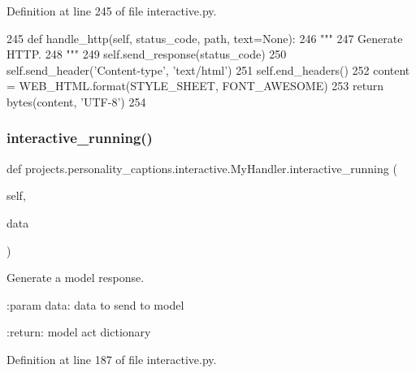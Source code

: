 Definition at line 245 of file interactive.\+py.


\begin{DoxyCode}
245     \textcolor{keyword}{def }handle\_http(self, status\_code, path, text=None):
246         \textcolor{stringliteral}{"""}
247 \textcolor{stringliteral}{        Generate HTTP.}
248 \textcolor{stringliteral}{        """}
249         self.send\_response(status\_code)
250         self.send\_header(\textcolor{stringliteral}{'Content-type'}, \textcolor{stringliteral}{'text/html'})
251         self.end\_headers()
252         content = WEB\_HTML.format(STYLE\_SHEET, FONT\_AWESOME)
253         \textcolor{keywordflow}{return} bytes(content, \textcolor{stringliteral}{'UTF-8'})
254 
\end{DoxyCode}
\mbox{\label{classprojects_1_1personality__captions_1_1interactive_1_1MyHandler_ae58a0c4c564f54a29ff85afa26086e47}} 
\subsubsection{\texorpdfstring{interactive\+\_\+running()}{interactive\_running()}}
{\footnotesize\ttfamily def projects.\+personality\+\_\+captions.\+interactive.\+My\+Handler.\+interactive\+\_\+running (\begin{DoxyParamCaption}\item[{}]{self,  }\item[{}]{data }\end{DoxyParamCaption})}

\begin{DoxyVerb}Generate a model response.

:param data:
    data to send to model

:return:
    model act dictionary
\end{DoxyVerb}
 

Definition at line 187 of file interactive.\+py.



